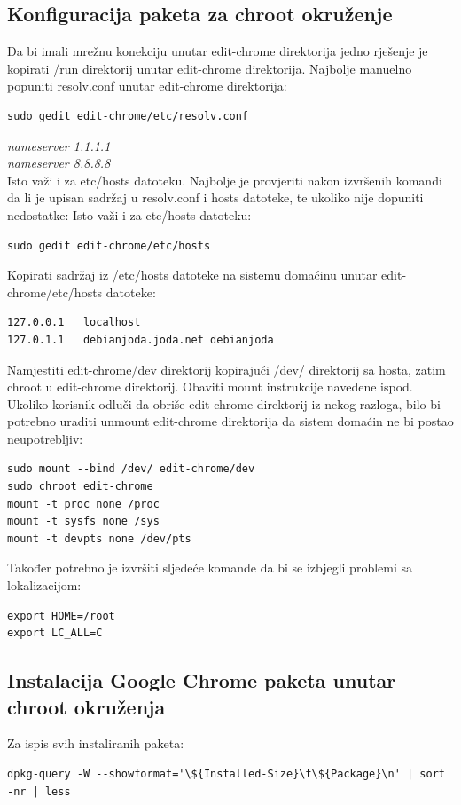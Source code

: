 \documentclass[12pt,vi]{mitthesis}
\begin{document}
\subsection*{Konfiguracija paketa za chroot okruženje}
\indent
Da bi imali mrežnu konekciju unutar edit-chrome direktorija jedno rješenje je kopirati /run direktorij unutar edit-chrome direktorija.
Najbolje manuelno popuniti resolv.conf unutar edit-chrome direktorija: \\
\begin{lstlisting}[style=BashInputStyle]
sudo gedit edit-chrome/etc/resolv.conf
\end{lstlisting}
\textit{nameserver 1.1.1.1 \\
nameserver 8.8.8.8}\\
Isto važi i za etc/hosts datoteku. Najbolje je provjeriti nakon izvršenih komandi da li je upisan sadržaj u resolv.conf i hosts datoteke, te ukoliko nije dopuniti nedostatke:
\noindent
Isto važi i za etc/hosts datoteku:
\begin{lstlisting}[style=BashInputStyle]
sudo gedit edit-chrome/etc/hosts
\end{lstlisting}
Kopirati sadržaj iz /etc/hosts datoteke na sistemu domaćinu unutar edit-chrome/etc/hosts datoteke:
\begin{lstlisting}
127.0.0.1	localhost
127.0.1.1	debianjoda.joda.net	debianjoda
\end{lstlisting}

\noindent
Namjestiti edit-chrome/dev direktorij kopirajući /dev/ direktorij sa hosta, zatim chroot u edit-chrome direktorij.
Obaviti mount instrukcije navedene ispod. Ukoliko korisnik odluči da obriše edit-chrome direktorij iz nekog razloga,
bilo bi potrebno uraditi unmount edit-chrome direktorija da sistem domaćin ne bi postao neupotrebljiv:
\begin{lstlisting}[style=BashInputStyle]
sudo mount --bind /dev/ edit-chrome/dev
sudo chroot edit-chrome
mount -t proc none /proc
mount -t sysfs none /sys
mount -t devpts none /dev/pts
\end{lstlisting}

Također potrebno je izvršiti sljedeće komande da bi se izbjegli problemi sa lokalizacijom:
\begin{lstlisting}[style=BashInputStyle]
export HOME=/root
export LC_ALL=C
\end{lstlisting}

\subsection*{Instalacija Google Chrome paketa unutar chroot okruženja}
\noindent
Za ispis svih instaliranih paketa:
\begin{lstlisting}[style=BashInputStyle]
dpkg-query -W --showformat='\${Installed-Size}\t\${Package}\n' | sort -nr | less
\end{lstlisting}
\end{document}
